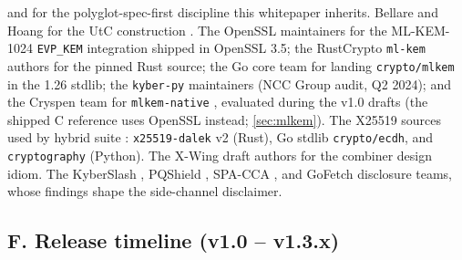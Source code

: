 \pqid{} and \pqhash{} for the polyglot-spec-first discipline this whitepaper inherits. Bellare and Hoang for the UtC construction \citep{bellare2022commitment}. The OpenSSL maintainers for the ML-KEM-1024 \texttt{EVP\_KEM} integration shipped in OpenSSL 3.5; the RustCrypto \texttt{ml-kem} authors for the pinned Rust source; the Go core team for landing \texttt{crypto/mlkem} in the 1.26 stdlib; the \texttt{kyber-py} maintainers (NCC Group audit, Q2 2024); and the Cryspen team for \texttt{mlkem-native} \citep{cryspen2025mlkem}, evaluated during the v1.0 drafts (the shipped C reference uses OpenSSL instead; \cref{sec:mlkem}). The X25519 sources used by hybrid suite : \texttt{x25519-dalek} v2 (Rust), Go stdlib \texttt{crypto/ecdh}, and \texttt{cryptography} (Python). The X-Wing draft authors \citep{xwing-draft} for the combiner design idiom. The KyberSlash \citep{kyberslash}, PQShield \citep{pqshield2024}, SPA-CCA \citep{guo2024spa}, and GoFetch \citep{gofetch} disclosure teams, whose findings shape the side-channel disclaimer.

\subsection*{F. Release timeline (v1.0 -- v1.3.x)}
\label{sec:appendix:timeline}

